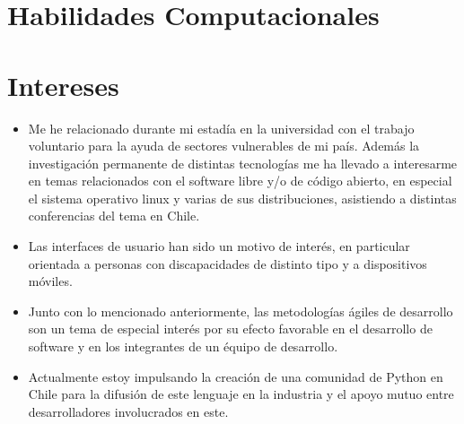 \documentclass[letterpaper,10pt]{moderncv}
\begin{document}
\bigskip

\section{Habilidades Computacionales}


\bigskip

\section{Intereses}

\begin{itemize}
\item Me he relacionado durante mi estad\'ia en la universidad con el trabajo voluntario para la ayuda de sectores vulnerables de mi pa\'is. Adem\'as la investigaci\'on permanente de distintas tecnolog\'ias me ha llevado a interesarme en temas relacionados con el software libre y/o de c\'odigo abierto, en especial el sistema operativo linux y varias de sus distribuciones, asistiendo a distintas conferencias del tema en Chile.

\item Las interfaces de usuario han sido un motivo de interés, en particular orientada a personas con discapacidades de distinto tipo y a dispositivos móviles.

\item Junto con lo mencionado anteriormente, las metodologías ágiles de desarrollo son un tema de especial interés por su efecto favorable en el desarrollo de software y en los integrantes de un équipo de desarrollo.

\item Actualmente estoy impulsando la creaci\'on de una comunidad de Python en Chile para la difusi\'on de este lenguaje en la industria y el apoyo mutuo entre desarrolladores involucrados en este.
\end{itemize}

\nocite{*}
%
%
\end{document}
